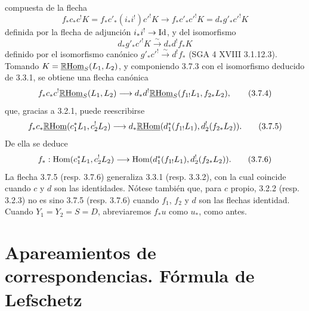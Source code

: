 compuesta de la flecha
\[
f_*c_*c^!K=f_*c'_*(i_*i^!)c'^!K\longrightarrow f_*c'_*c'^!K=d_*g'_*c'^!K
\]
definida por la flecha de adjunción $i_*i^!\to\mathrm{Id}$, y del isomorfismo
\[
d_*g'_*c'^!K\xrightarrow{\sim}d_*d^!f_*K
\]
definido por el isomorfismo canónico $g'_*c'^!\xrightarrow{\sim}d^!f_*$ (SGA 4 XVIII 3.1.12.3). Tomando $K=\underline{\mathbb{R}\mathrm{Hom}}_S(L_1,L_2)$, y componiendo 3.7.3 con el isomorfismo deducido de 3.3.1, se obtiene una flecha canónica
\begin{equation}
f_*c_*c^!\underline{\mathbb{R}\mathrm{Hom}}_S(L_1,L_2)
\longrightarrow
 d_*d^!\underline{\mathbb{R}\mathrm{Hom}}_S(f_{1!}L_1,f_{2*}L_2),
\tag{3.7.4}
\end{equation}
que, gracias a 3.2.1, puede reescribirse
\begin{equation}
f_*c_*\underline{\mathbb{R}\mathrm{Hom}}(c_1^*L_1,c_2^!L_2)
\longrightarrow
 d_*\underline{\mathbb{R}\mathrm{Hom}}(d_1^*(f_{1!}L_1),d_2^!(f_{2*}L_2)).
\tag{3.7.5}
\end{equation}
De ella se deduce
\begin{equation}
f_*:\operatorname{Hom}(c_1^*L_1,c_2^!L_2)
\longrightarrow
\operatorname{Hom}(d_1^*(f_{1!}L_1),d_2^!(f_{2*}L_2)).
\tag{3.7.6}
\end{equation}
La flecha 3.7.5 (resp. 3.7.6) generaliza 3.3.1 (resp. 3.3.2), con la cual coincide cuando $c$ y $d$ son las identidades. Nótese también que, para $c$ propio, 3.2.2 (resp. 3.2.3) no es sino 3.7.5 (resp. 3.7.6) cuando $f_1$, $f_2$ y $d$ son las flechas identidad. Cuando $Y_1=Y_2=S=D$, abreviaremos $f_*u$ como $u_*$, como antes.

\section{Apareamientos de correspondencias. Fórmula de Lefschetz}
